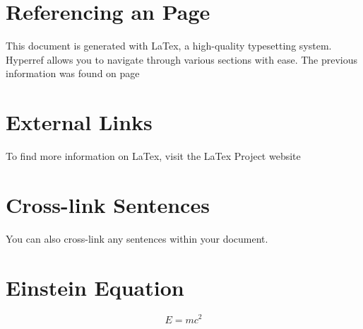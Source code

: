 \documentclass{article}
\begin{document}
\section{Referencing an Page}
\label{sec:page}
This document is generated with LaTex, a high-quality typesetting system. Hyperref allows you to navigate through various sections with ease. The previous information was found on page

\section{External Links}
To find more information on LaTex, visit the LaTex Project website

\section{Cross-link Sentences}
You can also cross-link any sentences within your document.


\section{Einstein Equation}
\begin{equation}
E = mc^2
\label{eq:einstein}
\end{equation}
\end{document}
